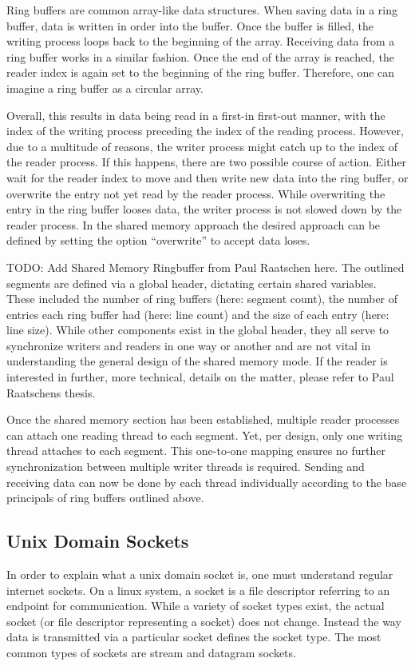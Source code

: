 Ring buffers are common array-like data structures.
When saving data in a ring buffer, data is written in order into the buffer.
Once the buffer is filled, the writing process loops back to the beginning of the array.
Receiving data from a ring buffer works in a similar fashion.
Once the end of the array is reached, the reader index is again set to the beginning of the ring buffer.
Therefore, one can imagine a ring buffer as a circular array.

Overall, this results in data being read in a first-in first-out manner, with the index of the writing process preceding the index of the reading process.
However, due to a multitude of reasons, the writer process might catch up to the index of the reader process.
If this happens, there are two possible course of action.
Either wait for the reader index to move and then write new data into the ring buffer, or overwrite the entry not yet read by the reader process.
While overwriting the entry in the ring buffer looses data, the writer process is not slowed down by the reader process.
In the shared memory approach the desired approach can be defined by setting the option ``overwrite'' to accept data loses.\cite{raatschen:ipc}

\noindent
TODO: Add Shared Memory Ringbuffer from Paul Raatschen here.
The outlined segments are defined via a global header, dictating certain shared variables.
These included the number of ring buffers (here\@: segment count), the number of entries each ring buffer had (here\@: line count) and the size of each entry (here\@: line size).
While other components exist in the global header, they all serve to synchronize writers and readers in one way or another and are not vital in understanding the general design of the shared memory mode.
If the reader is interested in further, more technical, details on the matter, please refer to Paul Raatschens thesis\cite{raatschen:ipc}.

Once the shared memory section has been established, multiple reader processes can attach one reading thread to each segment.
Yet, per design, only one writing thread attaches to each segment.
This one-to-one mapping ensures no further synchronization between multiple writer threads is required.
Sending and receiving data can now be done by each thread individually according to the base principals of ring buffers outlined above.

\subsection{Unix Domain Sockets}
In order to explain what a unix domain socket is, one must understand regular internet sockets.
On a linux system, a socket is a file descriptor referring to an endpoint for communication\cite{man:sockets}.
While a variety of socket types exist, the actual socket (or file descriptor representing a socket) does not change.
Instead the way data is transmitted via a particular socket defines the socket type.
The most common types of sockets are stream and datagram sockets.

